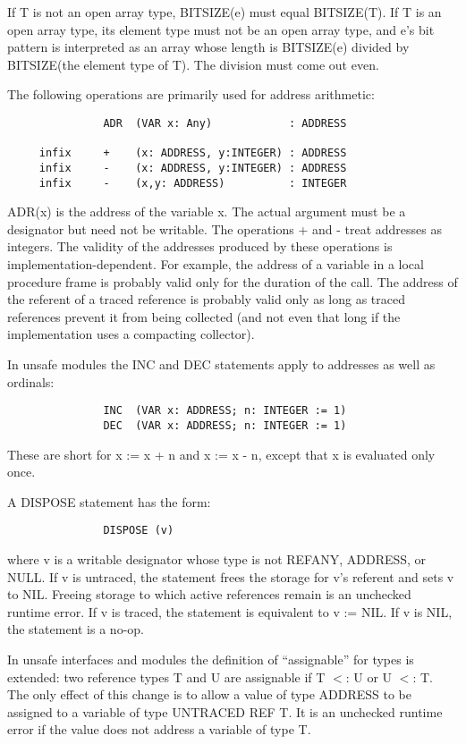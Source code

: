 \documentclass[10pt]{article}
\begin{document}
  If T is not an open array type, BITSIZE(e) must equal BITSIZE(T). If T is an open array type, its element type must not be an open array type, and e's bit pattern is interpreted as an array whose length is BITSIZE(e) divided by BITSIZE(the element type of T). The division must come out even. 


 The following operations are primarily used for address arithmetic: 
\begin{verbatim}
               ADR  (VAR x: Any)            : ADDRESS 

     infix     +    (x: ADDRESS, y:INTEGER) : ADDRESS
     infix     -    (x: ADDRESS, y:INTEGER) : ADDRESS
     infix     -    (x,y: ADDRESS)          : INTEGER
\end{verbatim}
 ADR(x) is the address of the variable x. The actual argument must be a designator but need not be writable. The operations + and - treat addresses as integers. The validity of the addresses produced by these operations is implementation-dependent. For example, the address of a variable in a local procedure frame is probably valid only for the duration of the call. The address of the referent of a traced reference is probably valid only as long as traced references prevent it from being collected (and not even that long if the implementation uses a compacting collector). 


 In unsafe modules the INC and DEC statements apply to addresses as well as ordinals: 
\begin{verbatim}
               INC  (VAR x: ADDRESS; n: INTEGER := 1)
               DEC  (VAR x: ADDRESS; n: INTEGER := 1)
\end{verbatim}
 These are short for x := x + n and x := x - n, except that x is evaluated only once. 


 A DISPOSE statement has the form: 
\begin{verbatim}
               DISPOSE (v)
\end{verbatim}
 where v is a writable designator whose type is not REFANY, ADDRESS, or NULL. If v is untraced, the statement frees the storage for v's referent and sets v to NIL. Freeing storage to which active references remain is an unchecked runtime error. If v is traced, the statement is equivalent to v := NIL. If v is NIL, the statement is a no-op. 


 In unsafe interfaces and modules the definition of ``assignable'' for types is extended: two reference types T and U are assignable if T $<$: U or U $<$: T. The only effect of this change is to allow a value of type ADDRESS to be assigned to a variable of type UNTRACED REF T. It is an unchecked runtime error if the value does not address a variable of type T. 
\end{document}
